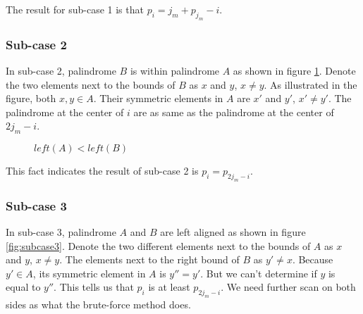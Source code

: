 \documentclass[b5paper]{article}
\begin{document}
The result for sub-case 1 is that $p_i = j_m + p_{j_m} - i$.

\subsubsection*{Sub-case 2}

In sub-case 2, palindrome $B$ is within palindrome $A$ as shown in figure \cref{fig:subcase2}.
Denote the two elements next to the bounds of $B$ as $x$ and $y$, $x \neq y$. As illustrated
in the figure, both $x, y \in A$. Their symmetric elements in $A$ are $x'$ and $y'$, $x' \neq y'$.
The palindrome at the center of $i$ are as same as the palindrome at the center of $2j_m - i$.


\begin{figure}[htbp]
\centering
{}
\caption{$left(A) < left(B)$}
\label{fig:subcase2}
\end{figure}

This fact indicates the result of sub-case 2 is $p_i = p_{2j_m - i}$.

\subsubsection*{Sub-case 3}

In sub-case 3, palindrome $A$ and $B$ are left aligned as shown in figure
\cref{fig:subcase3}. Denote the two different elements
next to the bounds of $A$ as $x$ and $y$, $x \neq y$. The elements next to
the right bound of $B$ as $y' \neq x$. Because $y' \in A$, its symmetric element in $A$
is $y'' = y'$. But we can't determine if $y$ is equal to $y''$. This tells us
that $p_i$ is at least $p_{2j_m - i}$. We need further scan on both sides
as what the brute-force method does.
\end{document}
